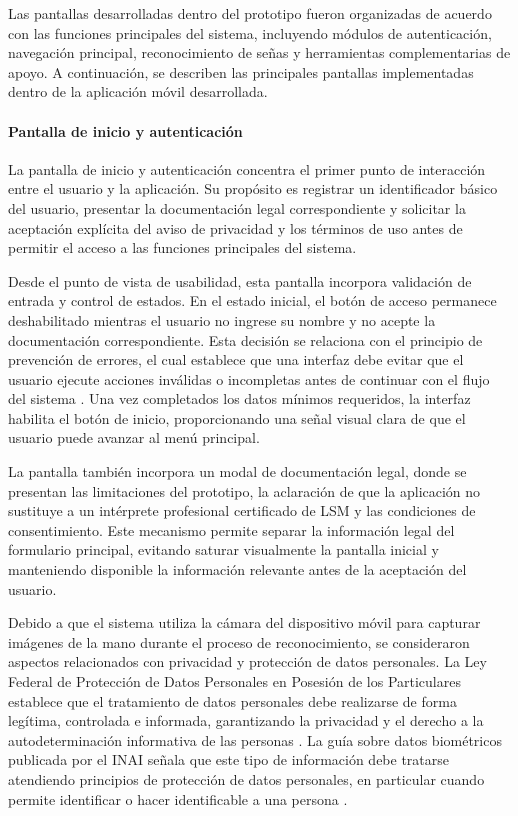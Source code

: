 	Las pantallas desarrolladas dentro del prototipo fueron organizadas de acuerdo con
	las funciones principales del sistema, incluyendo módulos de autenticación,
	navegación principal, reconocimiento de señas y herramientas complementarias de
	apoyo. A continuación, se describen las principales pantallas implementadas dentro
	de la aplicación móvil desarrollada.
	
	\paragraph{Pantalla de inicio y autenticación}
	
	
	La pantalla de inicio y autenticación concentra el primer punto de interacción
	entre el usuario y la aplicación. Su propósito es registrar un identificador
	básico del usuario, presentar la documentación legal correspondiente y solicitar
	la aceptación explícita del aviso de privacidad y los términos de uso antes de
	permitir el acceso a las funciones principales del sistema.
	
	Desde el punto de vista de usabilidad, esta pantalla incorpora validación de
	entrada y control de estados. En el estado inicial, el botón de acceso permanece
	deshabilitado mientras el usuario no ingrese su nombre y no acepte la
	documentación correspondiente. Esta decisión se relaciona con el principio de
	prevención de errores, el cual establece que una interfaz debe evitar que el
	usuario ejecute acciones inválidas o incompletas antes de continuar con el flujo
	del sistema \cite{nielsen1994usability}. Una vez completados los datos mínimos
	requeridos, la interfaz habilita el botón de inicio, proporcionando una señal
	visual clara de que el usuario puede avanzar al menú principal.
	
	La pantalla también incorpora un modal de documentación legal, donde se presentan
	las limitaciones del prototipo, la aclaración de que la aplicación no sustituye a
	un intérprete profesional certificado de LSM y las condiciones de consentimiento.
	Este mecanismo permite separar la información legal del formulario principal,
	evitando saturar visualmente la pantalla inicial y manteniendo disponible la
	información relevante antes de la aceptación del usuario.
	
	Debido a que el sistema utiliza la cámara del dispositivo móvil para capturar
	imágenes de la mano durante el proceso de reconocimiento, se consideraron aspectos
	relacionados con privacidad y protección de datos personales. La Ley Federal de
	Protección de Datos Personales en Posesión de los Particulares establece que el
	tratamiento de datos personales debe realizarse de forma legítima, controlada e
	informada, garantizando la privacidad y el derecho a la autodeterminación
	informativa de las personas \cite{lfpdppp}. La guía sobre datos
	biométricos publicada por el INAI señala que este tipo de información debe
	tratarse atendiendo principios de protección de datos personales, en particular
	cuando permite identificar o hacer identificable a una persona \cite{inaiBiometricos}.
	
